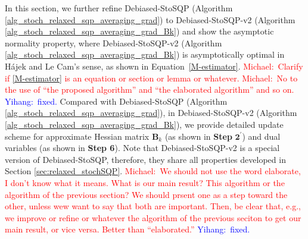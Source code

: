 \documentclass[aos]{imsart}
\numberwithin{equation}{section}
\theoremstyle{plain}
\newcommand{\michael}[1]{\textcolor{red}{Michael:\ #1}}
\newcommand{\yihang}[1]{\textcolor{blue}{Yihang:\ #1}}
\begin{document}
In this section, we further refine Debiased-StoSQP  (Algorithm \ref{alg_stoch_relaxed_sqp_averaging_grad}) to Debiased-StoSQP-v2 (Algorithm \ref{alg_stoch_relaxed_sqp_averaging_grad_Bk}) and show the asymptotic normality property, where Debiased-StoSQP-v2 (Algorithm \ref{alg_stoch_relaxed_sqp_averaging_grad_Bk}) is asymptotically optimal in H\'ajek and Le Cam's sense, as shown in Equation~\eqref{M-estimator}. 
\michael{Clarify if \ref{M-estimator} is an equation or section or lemma or whatever.}
\michael{No to the use of ``the proposed algorithm'' and ``the elaborated algorithm'' and so on.} \yihang{fixed.}
Compared with Debiased-StoSQP (Algorithm \ref{alg_stoch_relaxed_sqp_averaging_grad}), in Debiased-StoSQP-v2 (Algorithm \ref{alg_stoch_relaxed_sqp_averaging_grad_Bk}), we provide detailed update scheme for approximate Hessian matrix $\bm{B}_k$ (as shown in \textbf{Step} $\mathbf{2^{\prime}}$) and dual variables (as shown in \textbf{Step 6}). Note that Debiased-StoSQP-v2 is a special version of Debiased-StoSQP, therefore, they share all properties developed in Section \ref{sec:relaxed_stochSQP}.
\michael{We should not use the word elaborate, I don't know what it means.  What is our main result?  This algorithm or the algorithm of the previous section?  We should prsent one as a step toward the other, unless wew want to say that both are important.  Then, be clear that, e.g., we improve or refine or whatever the algorithm of the previous seciton to get our main result, or vice versa.  Better than ``elaborated.''}
\yihang{fixed.}
\end{document}
